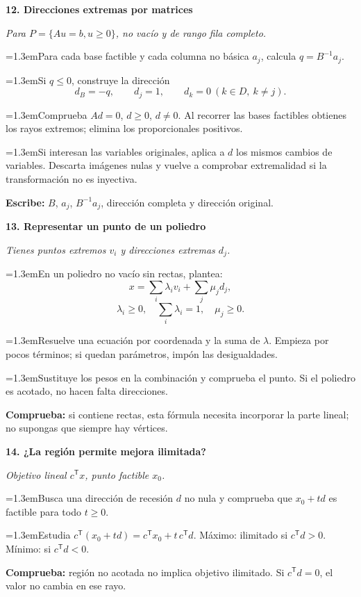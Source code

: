 \documentclass[a4paper,landscape]{article}
\newcommand{\T}{^{\mathsf T}}
\newcommand{\caso}[2]{\par\vspace{5pt}\colorbox{pale}{\parbox{\dimexpr\linewidth-2\fboxsep}{\bfseries\color{accent}#1}}\par\textit{#2}\par}
\newcommand{\paso}[2]{\par\hangindent=1.3em\hangafter=1\makebox[1.3em][l]{\textbf{\color{accent}#1}}#2}
\newcommand{\escribe}[1]{\par\textbf{Escribe:} #1}
\newcommand{\ojo}[1]{\par\textbf{Comprueba:} #1}
\newcommand{\columna}[1]{\begin{minipage}[t]{0.319\textwidth}\fontsize{9.2}{10.6}\selectfont\RaggedRight #1\end{minipage}}
\begin{document}
\columna{
\caso{12. Direcciones extremas por matrices}{Para \(P=\{Au=b,u\ge0\}\), no vacío y de rango fila completo.}
\paso{1.}{Para cada base factible y cada columna no básica \(a_j\), calcula \(q=B^{-1}a_j\).}
\paso{2.}{Si \(q\le0\), construye la dirección
\[d_B=-q,\qquad d_j=1,\qquad d_k=0\ (k\in D,\ k\ne j).\]}
\paso{3.}{Comprueba \(Ad=0\), \(d\ge0\), \(d\ne0\). Al recorrer las bases factibles obtienes los rayos extremos; elimina los proporcionales positivos.}
\paso{4.}{Si interesan las variables originales, aplica a \(d\) los mismos cambios de variables. Descarta imágenes nulas y vuelve a comprobar extremalidad si la transformación no es inyectiva.}
\escribe{\(B\), \(a_j\), \(B^{-1}a_j\), dirección completa y dirección original.}

\caso{13. Representar un punto de un poliedro}{Tienes puntos extremos \(v_i\) y direcciones extremas \(d_j\).}
\paso{1.}{En un poliedro no vacío sin rectas, plantea:
\[x=\sum_i\lambda_i v_i+\sum_j\mu_j d_j,\]
\[\lambda_i\ge0,\quad\sum_i\lambda_i=1,\quad\mu_j\ge0.\]}
\paso{2.}{Resuelve una ecuación por coordenada y la suma de \(\lambda\). Empieza por pocos términos; si quedan parámetros, impón las desigualdades.}
\paso{3.}{Sustituye los pesos en la combinación y comprueba el punto. Si el poliedro es acotado, no hacen falta direcciones.}
\ojo{si contiene rectas, esta fórmula necesita incorporar la parte lineal; no supongas que siempre hay vértices.}

\caso{14. ¿La región permite mejora ilimitada?}{Objetivo lineal \(c\T x\), punto factible \(x_0\).}
\paso{1.}{Busca una dirección de recesión \(d\) no nula y comprueba que \(x_0+td\) es factible para todo \(t\ge0\).}
\paso{2.}{Estudia \(c\T(x_0+td)=c\T x_0+t\,c\T d\). Máximo: ilimitado si \(c\T d>0\). Mínimo: si \(c\T d<0\).}
\ojo{región no acotada no implica objetivo ilimitado. Si \(c\T d=0\), el valor no cambia en ese rayo.}
}
\hfill
\end{document}
